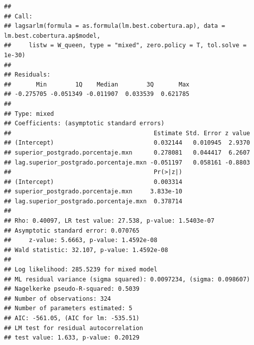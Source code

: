 \documentclass[12pt,]{book}
\newenvironment{Shaded}{\begin{snugshade}}{\end{snugshade}}
\newcommand{\KeywordTok}[1]{\textcolor[rgb]{0.13,0.29,0.53}{\textbf{#1}}}
\newcommand{\DataTypeTok}[1]{\textcolor[rgb]{0.13,0.29,0.53}{#1}}
\newcommand{\CommentTok}[1]{\textcolor[rgb]{0.56,0.35,0.01}{\textit{#1}}}
\newcommand{\OperatorTok}[1]{\textcolor[rgb]{0.81,0.36,0.00}{\textbf{#1}}}
\newcommand{\NormalTok}[1]{#1}
\begin{document}
\begin{verbatim}
## 
## Call:
## lagsarlm(formula = as.formula(lm.best.cobertura.ap), data = lm.best.cobertura.ap$model, 
##     listw = W_queen, type = "mixed", zero.policy = T, tol.solve = 1e-30)
## 
## Residuals:
##       Min        1Q    Median        3Q       Max 
## -0.275705 -0.051349 -0.011907  0.033539  0.621785 
## 
## Type: mixed 
## Coefficients: (asymptotic standard errors) 
##                                        Estimate Std. Error z value
## (Intercept)                            0.032144   0.010945  2.9370
## superior_postgrado.porcentaje.mxn      0.278081   0.044417  6.2607
## lag.superior_postgrado.porcentaje.mxn -0.051197   0.058161 -0.8803
##                                        Pr(>|z|)
## (Intercept)                            0.003314
## superior_postgrado.porcentaje.mxn     3.833e-10
## lag.superior_postgrado.porcentaje.mxn  0.378714
## 
## Rho: 0.40097, LR test value: 27.538, p-value: 1.5403e-07
## Asymptotic standard error: 0.070765
##     z-value: 5.6663, p-value: 1.4592e-08
## Wald statistic: 32.107, p-value: 1.4592e-08
## 
## Log likelihood: 285.5239 for mixed model
## ML residual variance (sigma squared): 0.0097234, (sigma: 0.098607)
## Nagelkerke pseudo-R-squared: 0.5039 
## Number of observations: 324 
## Number of parameters estimated: 5 
## AIC: -561.05, (AIC for lm: -535.51)
## LM test for residual autocorrelation
## test value: 1.633, p-value: 0.20129
\end{verbatim}

\begin{Shaded}
\end{Shaded}
\end{document}
